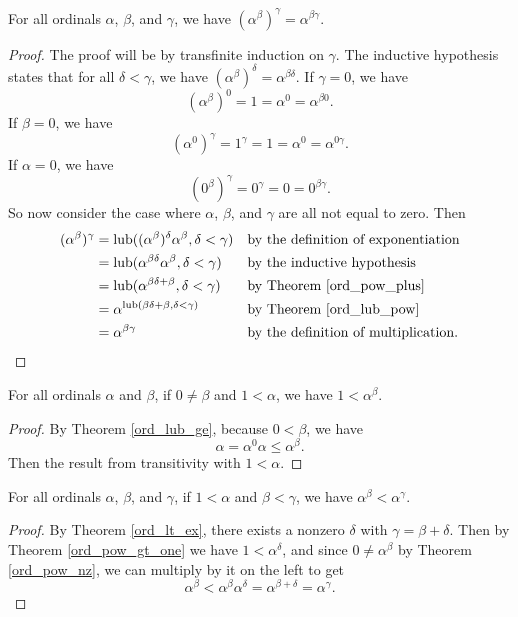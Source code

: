 \documentclass[../../math.tex]{subfiles}
\begin{document}
\begin{theorem} \label{ord_pow_pow}
    For all ordinals $\alpha$, $\beta$, and $\gamma$, we have $(\alpha ^ \beta)
    ^ \gamma = \alpha ^ {\beta \gamma}$.
\end{theorem}
\begin{proof}
    The proof will be by transfinite induction on $\gamma$.  The inductive
    hypothesis states that for all $\delta < \gamma$, we have $(\alpha ^ \beta)
    ^ \delta = \alpha ^ {\beta \delta}$.  If $\gamma = 0$, we have
    \[
        (\alpha ^ \beta) ^ 0 = 1 = \alpha^0 = \alpha^{\beta 0}.
    \]
    If $\beta = 0$, we have
    \[
        (\alpha ^ 0) ^ \gamma = 1 ^ \gamma = 1 = \alpha ^ 0 = \alpha^{0 \gamma}.
    \]
    If $\alpha = 0$, we have
    \[
        (0 ^ \beta) ^ \gamma = 0 ^ \gamma = 0 = 0 ^ {\beta \gamma}.
    \]
    So now consider the case where $\alpha$, $\beta$, and $\gamma$ are all not
    equal to zero.  Then
    \begin{align*}
        (\alpha ^ \beta) ^ \gamma
        &= \operatorname{lub}((\alpha ^ \beta) ^ \delta \alpha^\beta, \delta < \gamma)
            && \text{by the definition of exponentiation} \\
        &= \operatorname{lub}(\alpha ^ {\beta \delta} \alpha^\beta, \delta < \gamma)
            && \text{by the inductive hypothesis} \\
        &= \operatorname{lub}(\alpha ^ {\beta \delta + \beta}, \delta < \gamma)
            && \text{by Theorem \ref{ord_pow_plus}} \\
        &= \alpha ^ {\operatorname{lub}(\beta \delta + \beta, \delta < \gamma)}
            && \text{by Theorem \ref{ord_lub_pow}} \\
        &= \alpha ^ {\beta\gamma}
            && \text{by the definition of multiplication.}
    \end{align*}
\end{proof}

\begin{theorem} \label{ord_pow_gt_one}
    For all ordinals $\alpha$ and $\beta$, if $0 \neq \beta$ and $1 < \alpha$,
    we have $1 < \alpha ^ \beta$.
\end{theorem}
\begin{proof}
    By Theorem \ref{ord_lub_ge}, because $0 < \beta$, we have
    \[
        \alpha = \alpha^0 \alpha \leq \alpha ^ \beta.
    \]
    Then the result from transitivity with $1 < \alpha$.
\end{proof}

\begin{theorem} \label{ord_pow_lt}
    For all ordinals $\alpha$, $\beta$, and $\gamma$, if $1 < \alpha$ and $\beta
    < \gamma$, we have $\alpha ^ \beta < \alpha ^ \gamma$.
\end{theorem}
\begin{proof}
    By Theorem \ref{ord_lt_ex}, there exists a nonzero $\delta$ with $\gamma =
    \beta + \delta$.  Then by Theorem \ref{ord_pow_gt_one} we have $1 < \alpha ^
    \delta$, and since $0 \neq \alpha ^ \beta$ by Theorem \ref{ord_pow_nz}, we
    can multiply by it on the left to get
    \[
        \alpha^\beta < \alpha^\beta \alpha^\delta = \alpha^{\beta + \delta}
        = \alpha^\gamma.
    \]
\end{proof}
\end{document}

